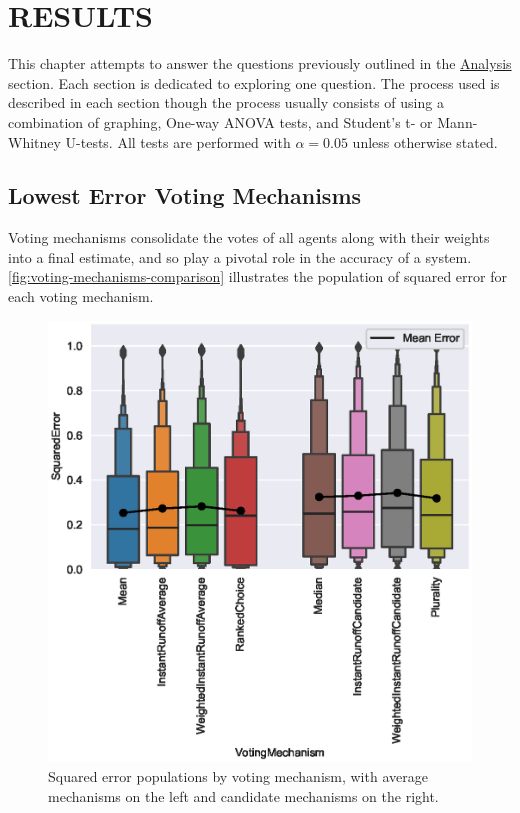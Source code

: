 %
%

\chapter{RESULTS}\label{ch:results}
This chapter attempts to answer the questions previously outlined in the
\hyperref[subsec:analysis]{Analysis} section.
Each section is dedicated to exploring one question.
The process used is described in each section though the process usually
consists of using a combination of graphing, One-way ANOVA tests, and
Student's t- or Mann-Whitney U-tests.
All tests are performed with $\alpha = 0.05$ unless otherwise stated.


\section{Lowest Error Voting Mechanisms}\label{sec:lowest-error-voting-mechanism}
Voting mechanisms consolidate the votes of all agents along with their weights
into a final estimate, and so play a pivotal role in the accuracy of a system.
\autoref{fig:voting-mechanisms-comparison} illustrates the population of
squared error for each voting mechanism.

\begin{figure}[htbp]
    \centering
    \includegraphics[scale=0.75]
    {./content/figures/voting_mechanisms/voting_mechanisms_comparison}
    \caption{Squared error populations by voting mechanism, with average
    mechanisms on the left and candidate mechanisms on the right.}
    \label{fig:voting-mechanisms-comparison}
\end{figure}

